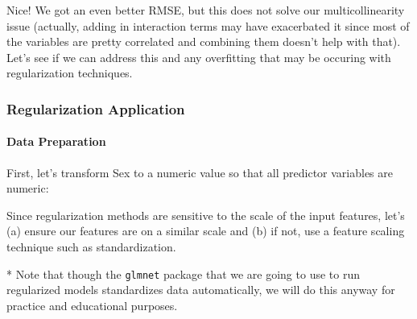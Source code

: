\documentclass[
]{article}
\newenvironment{Shaded}{\begin{snugshade}}{\end{snugshade}}
\newcommand{\AttributeTok}[1]{\textcolor[rgb]{0.13,0.29,0.53}{#1}}
\newcommand{\FunctionTok}[1]{\textcolor[rgb]{0.13,0.29,0.53}{\textbf{#1}}}
\newcommand{\NormalTok}[1]{#1}
\newcommand{\OtherTok}[1]{\textcolor[rgb]{0.56,0.35,0.01}{#1}}
\newcommand{\SpecialCharTok}[1]{\textcolor[rgb]{0.81,0.36,0.00}{\textbf{#1}}}
\begin{document}
Nice! We got an even better RMSE, but this does not solve our
multicollinearity issue (actually, adding in interaction terms may have
exacerbated it since most of the variables are pretty correlated and
combining them doesn't help with that). Let's see if we can address this
and any overfitting that may be occuring with regularization techniques.

\hypertarget{regularization-application}{%
\subsubsection{Regularization
Application}\label{regularization-application}}

\hypertarget{data-preparation}{%
\paragraph{Data Preparation}\label{data-preparation}}

First, let's transform Sex to a numeric value so that all predictor
variables are numeric:

\begin{Shaded}
\end{Shaded}

Since regularization methods are sensitive to the scale of the input
features, let's (a) ensure our features are on a similar scale and (b)
if not, use a feature scaling technique such as standardization.

* Note that though the \texttt{glmnet} package that we are going to use
to run regularized models standardizes data automatically, we will do
this anyway for practice and educational purposes.
\end{document}
